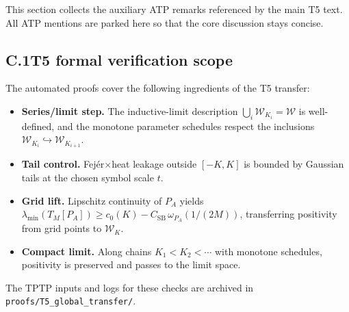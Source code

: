 This section collects the auxiliary ATP remarks referenced by the main T5 text.
All ATP mentions are parked here so that the core discussion stays concise.

\subsection*{C.1\quad T5 formal verification scope}\label{app:T5-scope}
The automated proofs cover the following ingredients of the T5 transfer:
\begin{itemize}
  \item \textbf{Series/limit step.} The inductive-limit description
  $\bigcup_i \mathcal W_{K_i}=\mathcal W$ is well-defined, and the monotone
  parameter schedules respect the inclusions $\mathcal W_{K_i}\hookrightarrow \mathcal W_{K_{i+1}}$.
  \item \textbf{Tail control.} Fej\'er$\times$heat leakage outside $[-K,K]$
  is bounded by Gaussian tails at the chosen symbol scale $t$.
  \item \textbf{Grid lift.} Lipschitz continuity of $P_A$ yields
  $\lambda_{\min}(T_M[P_A])\ge c_0(K)-C_{\mathrm{SB}}\,\omega_{P_A}(1/(2M))$,
  transferring positivity from grid points to $\mathcal W_K$.
  \item \textbf{Compact limit.} Along chains $K_1<K_2<\cdots$ with monotone schedules,
  positivity is preserved and passes to the limit space.
\end{itemize}
The TPTP inputs and logs for these checks are archived in
\texttt{proofs/T5\_global\_transfer/}.
